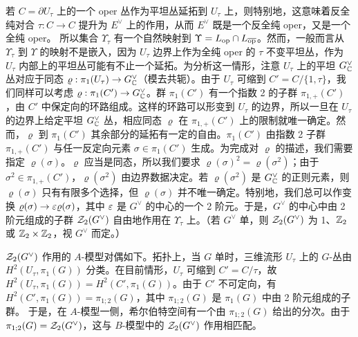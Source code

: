若 $C=\partial U_\tau$ 上的一个 oper 丛作为平坦丛延拓到 $U_\tau$ 上，则特别地，这意味着反全纯对合 $\tau:C\to C$ 提升为 $E^\vee$ 上的作用，从而 $E^\vee$ 既是一个反全纯 oper，又是一个全纯 oper。 所以集合 $\Upsilon_\tau$ 有一个自然映射到 $\Upsilon=L_{\mathrm{op}}\cap L_{\overline{\mathrm{op}}}$。然而，一般而言从 $\Upsilon_\tau$ 到 $\Upsilon$ 的映射不是嵌入，因为 $U_\tau$ 边界上作为全纯 oper 的 $\tau$ 不变平坦丛，作为 $U_\tau$ 内部上的平坦丛可能有不止一个延拓。为分析这一情形，注意 $U_\tau$ 上的平坦 $G^\vee_{\mathbb C}$ 丛对应于同态 $\varrho:\pi_1(U_\tau)\to G^\vee_{\mathbb C}$（模去共轭）。由于 $U_\tau$ 可缩到 $C'=C/\{1,\tau\}$，我们同样可以考虑 $\varrho:\pi_1(C')\to G^\vee_{\mathbb C}$。群 $\pi_1(C')$ 有一个指数 2 的子群 $\pi_{1,+}(C')$，由 $C'$ 中保定向的环路组成。这样的环路可以形变到 $U_\tau$ 的边界，所以一旦在 $U_\tau$ 的边界上给定平坦 $G^\vee_{\mathbb C}$ 丛，相应同态 $\varrho$ 在 $\pi_{1,+}(C')$ 上的限制就唯一确定。然而，$\varrho$ 到 $\pi_1(C')$ 其余部分的延拓有一定的自由。$\pi_1(C')$ 由指数 2 子群 $\pi_{1,+}(C')$ 与任一反定向元素 $\sigma\in \pi_1(C')$ 生成。为完成对 $\varrho$ 的描述，我们需要指定 $\varrho(\sigma)$。$\varrho$ 应当是同态，所以我们要求 $\varrho(\sigma)^2=\varrho(\sigma^2)$；由于 $\sigma^2\in \pi_{1,+}(C')$，$\varrho(\sigma^2)$ 由边界数据决定。若 $\varrho(\sigma^2)$ 是 $G^\vee_{\mathbb C}$ 的正则元素，则 $\varrho(\sigma)$ 只有有限多个选择，但 $\varrho(\sigma)$ 并不唯一确定。特别地，我们总可以作变换 $\varrho(\sigma)\to \varepsilon \varrho(\sigma)$，其中 $\varepsilon$ 是 $G^\vee$ 的中心的一个 2 阶元。于是，$G^\vee$ 的中心中由 2 阶元组成的子群 ${\mathcal Z}_2(G^\vee)$ 自由地作用在 $\Upsilon_\tau$ 上。（若 $G^\vee$ 单，则 ${\mathcal Z}_2(G^\vee)$ 为 1、${\mathbb Z}_2$ 或 ${\mathbb Z}_2\times {\mathbb Z}_2$，视 $G^\vee$ 而定。）

${\mathcal Z}_2(G^\vee)$ 作用的 $A$-模型对偶如下。拓扑上，当 $G$ 单时，三维流形 $U_\tau$ 上的 $G$-丛由 $H^2(U_\tau,\pi_1(G))$ 分类。在目前情形，$U_\tau$ 可缩到 $C'=C/\tau$，故 $H^2(U_\tau,\pi_1(G))=H^2(C',\pi_1(G))$。由于 $C'$ 不可定向，有 $H^2(C',\pi_1(G))=\pi_{1;2}(G)$，其中 $\pi_{1;2}(G)$ 是 $\pi_1(G)$ 中由 2 阶元组成的子群。 于是，在 $A$-模型一侧，希尔伯特空间有一个由 $\pi_{1;2}(G)$ 给出的分次。由于 $\pi_{1;2}(G)={\mathcal Z}_2(G^\vee)$，这与 $B$-模型中的 ${\mathcal Z}_2(G^\vee)$ 作用相匹配。


